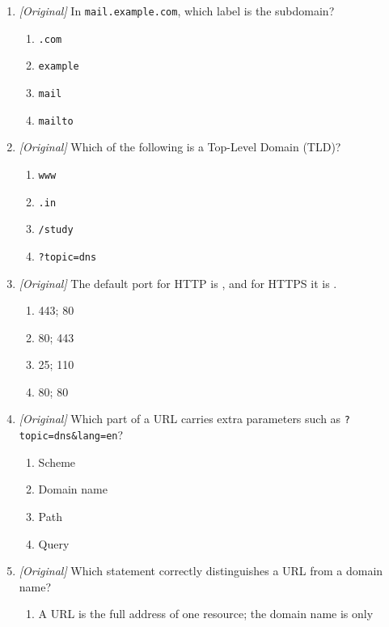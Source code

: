 \documentclass[11pt]{article}
\begin{document}
\begin{enumerate}[label=\textbf{Q\arabic*.}, leftmargin=*]
\begin{enumerate}[label=\Alph*.]
    \item \texttt{/study/computer}
  \end{enumerate}
\item \textit{[Original]} In \texttt{mail.example.com}, which label is the
  subdomain?
  \begin{enumerate}[label=\Alph*.]
    \item \texttt{.com}
    \item \texttt{example}
    \item \texttt{mail}
    \item \texttt{mailto}
  \end{enumerate}
\item \textit{[Original]} Which of the following is a Top-Level Domain
  (TLD)?
  \begin{enumerate}[label=\Alph*.]
    \item \texttt{www}
    \item \texttt{.in}
    \item \texttt{/study}
    \item \texttt{?topic=dns}
  \end{enumerate}
\item \textit{[Original]} The default port for HTTP is
  \underline{\hspace{1.2cm}}, and for HTTPS it is
  \underline{\hspace{1.2cm}}.
  \begin{enumerate}[label=\Alph*.]
    \item 443; 80
    \item 80; 443
    \item 25; 110
    \item 80; 80
  \end{enumerate}
\item \textit{[Original]} Which part of a URL carries extra parameters such
  as \texttt{?topic=dns\&lang=en}?
  \begin{enumerate}[label=\Alph*.]
    \item Scheme
    \item Domain name
    \item Path
    \item Query
  \end{enumerate}
\item \textit{[Original]} Which statement correctly distinguishes a URL from
  a domain name?
  \begin{enumerate}[label=\Alph*.]
    \item A URL is the full address of one resource; the domain name is only

\end{enumerate}
\end{enumerate}
\end{document}
